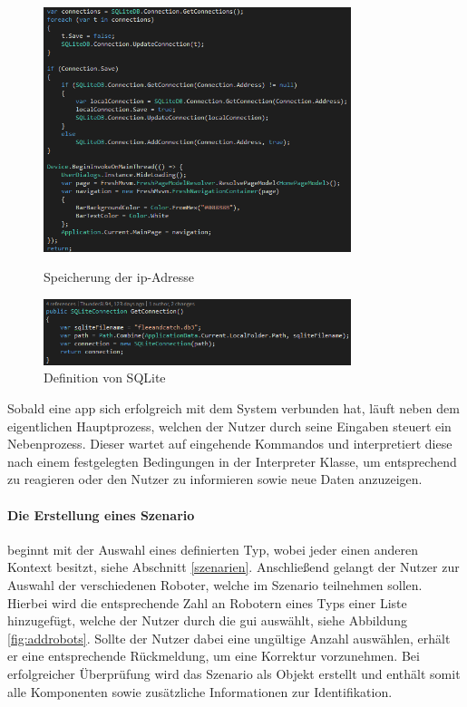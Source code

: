 \begin{figure}[h]
	\begin{center}
		\includegraphics[width=0.8\textwidth]{images/implementation/authorization.png}
	\end{center}	
	\caption{Speicherung der \gls{ip}-Adresse}
	\label{fig:saveip}
	\begin{center}
		\includegraphics[width=0.8\textwidth]{images/implementation/sqlite.png}
	\end{center}	
	\caption{Definition von SQLite}
	\label{fig:sqlite}
\end{figure}

\noindent
Sobald eine \gls{app} sich erfolgreich mit dem System verbunden hat, läuft neben dem eigentlichen Hauptprozess, welchen der Nutzer durch seine Eingaben steuert ein Nebenprozess. Dieser wartet auf eingehende Kommandos und interpretiert diese nach einem festgelegten Bedingungen in der Interpreter Klasse, um entsprechend zu reagieren oder den Nutzer zu informieren sowie neue Daten anzuzeigen.

\paragraph{Die Erstellung eines Szenario} beginnt mit der Auswahl eines definierten Typ, wobei jeder einen anderen Kontext besitzt, siehe Abschnitt \eqref{szenarien}. Anschließend gelangt der Nutzer zur Auswahl der verschiedenen Roboter, welche im Szenario teilnehmen sollen. Hierbei wird die entsprechende Zahl an Robotern eines Typs einer Liste hinzugefügt, welche der Nutzer durch die \gls{gui} auswählt, siehe Abbildung \eqref{fig:addrobots}. Sollte der Nutzer dabei eine ungültige Anzahl auswählen, erhält er eine entsprechende Rückmeldung, um eine Korrektur vorzunehmen. Bei erfolgreicher Überprüfung wird das Szenario als Objekt erstellt und enthält somit alle Komponenten sowie zusätzliche Informationen zur Identifikation.

